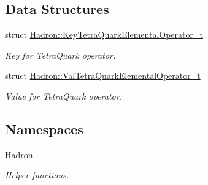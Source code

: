 \subsection*{Data Structures}
\begin{DoxyCompactItemize}
\item 
struct \mbox{\hyperlink{structHadron_1_1KeyTetraQuarkElementalOperator__t}{Hadron\+::\+Key\+Tetra\+Quark\+Elemental\+Operator\+\_\+t}}
\begin{DoxyCompactList}\small\item\em Key for Tetra\+Quark operator. \end{DoxyCompactList}\item 
struct \mbox{\hyperlink{structHadron_1_1ValTetraQuarkElementalOperator__t}{Hadron\+::\+Val\+Tetra\+Quark\+Elemental\+Operator\+\_\+t}}
\begin{DoxyCompactList}\small\item\em Value for Tetra\+Quark operator. \end{DoxyCompactList}\end{DoxyCompactItemize}
\subsection*{Namespaces}
\begin{DoxyCompactItemize}
\item 
 \mbox{\hyperlink{namespaceHadron}{Hadron}}
\begin{DoxyCompactList}\small\item\em Helper functions. \end{DoxyCompactList}\end{DoxyCompactItemize}
